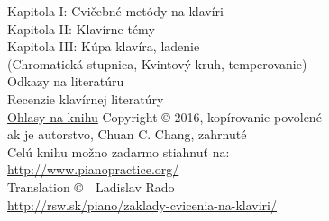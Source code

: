 \documentclass[11pt,a4paper]{book}
\begin{document}
\begin{center}
\vspace*{6em}
Kapitola I: Cvičebné metódy na klavíri
\vspace*{1em}\\
Kapitola II: Klavírne témy
\vspace*{1em}\\
Kapitola III: Kúpa klavíra, ladenie\\
(Chromatická stupnica, Kvintový kruh, temperovanie)
\vspace*{2em}\\
Odkazy na literatúru\\
Recenzie klavírnej literatúry
\vspace*{2em}\\
\href{http://www.pianopractice.org/testimonials.pdf}{Ohlasy na knihu}
\vfill
Copyright © 2016, kopírovanie povolené\\
ak je autorstvo, Chuan C. Chang, zahrnuté\\
Celú knihu možno zadarmo stiahnuť na:\\
\href{http://www.pianopractice.org/}{http://www.pianopractice.org/}\\
Translation \copyright\ \the\year\ Ladislav Rado\\
\href{http://rsw.sk/piano/zaklady-cvicenia-na-klaviri/}{http://rsw.sk/piano/zaklady-cvicenia-na-klaviri/}
\end{center}
\cleardoublepage
{}\setcounter{page}{1}%
\pagestyle{plain}
\tableofcontents
\begingroup
\vspace*{5em}
\end{document}
